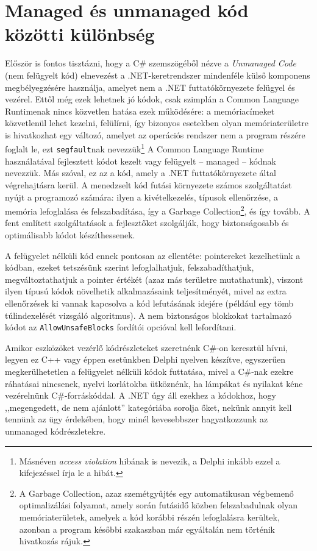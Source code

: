\documentclass[tocnopagenum]{thesis-ekf}
\theoremstyle{definition}
\theoremstyle{remark}
\begin{document}
	\section{Managed és unmanaged kód közötti különbség}
	\label{managed_unmanaged}
	Először is fontos tisztázni, hogy a C\# szemszögéből nézve a \textit{Unmanaged Code} (nem felügyelt kód) elnevezést a .NET-keretrendszer mindenféle külső komponens megbélyegzésére használja, amelyet nem a .NET futtatókörnyezete felügyel és vezérel. Ettől még ezek lehetnek jó kódok, csak szimplán a Common Language Runtimenak nincs közvetlen hatása ezek működésére: a memóriacímeket közvetlenül lehet kezelni, felülírni, így bizonyos esetekben olyan memóriaterületre is hivatkozhat egy változó, amelyet az operációs rendszer nem a program részére foglalt le, ezt \verb*|segfault|nak nevezzük\footnote{Másnéven \textit{access violation} hibának is nevezik, a Delphi inkább ezzel a kifejezéssel írja le a hibát.}
	\cite{managed} 
	A Common Language Runtime használatával fejlesztett kódot kezelt vagy felügyelt -- managed -- kódnak nevezzük. Más szóval, ez az a kód, amely a .NET futtatókörnyezete által végrehajtásra kerül. 
	A menedzselt kód futási környezete számos szolgáltatást nyújt a programozó számára: ilyen a kivételkezelés, típusok ellenőrzése, a memória lefoglalása és felszabadítása, így a Garbage Collection\footnote{A Garbage Collection, azaz szemétgyűjtés egy automatikusan végbemenő optimalizálási folyamat, amely során futásidő közben felszabadulnak olyan memóriaterületek, amelyek a kód korábbi részén lefoglalásra kerültek, azonban a program későbbi szakaszban már egyáltalán nem történik hivatkozás rájuk.}, és így tovább. A fent említett szolgáltatások a fejlesztőket szolgálják, hogy biztonságosabb és optimálisabb kódot készíthessenek.
	\cite{marshalling_serialization}
	
	A felügyelet nélküli kód ennek pontosan az ellentéte: pointereket kezelhetünk a kódban, ezeket tetszésünk szerint lefoglalhatjuk, felszabadíthatjuk, megváltoztathatjuk a pointer értékét (azaz más területre mutathatunk), viszont ilyen típusú kódok növelhetik alkalmazásaink teljesítményét, mivel az extra ellenőrzések ki vannak kapcsolva a kód lefutásának idejére (például egy tömb túlindexelését vizsgáló algoritmus).
	A nem biztonságos blokkokat tartalmazó kódot az \verb*|AllowUnsafeBlocks| fordítói opcióval kell lefordítani.
	
	Amikor eszközöket vezérlő kódrészleteket szeretnénk C\#-on keresztül hívni, legyen ez C++ vagy éppen esetünkben Delphi nyelven készítve, egyszerűen megkerülhetetlen a felügyelet nélküli kódok futtatása, mivel a C\#-nak ezekre ráhatásai nincsenek, nyelvi korlátokba ütköznénk, ha lámpákat és nyilakat kéne vezérelnünk C\#-forráskóddal. A .NET úgy áll ezekhez a kódokhoz, hogy ,,megengedett, de nem ajánlott'' kategóriába sorolja őket, nekünk annyit kell tennünk az ügy érdekében, hogy minél kevesebbszer hagyatkozzunk az unmanaged kódrészletekre.
	\cite{sof_managed}
\end{document}
